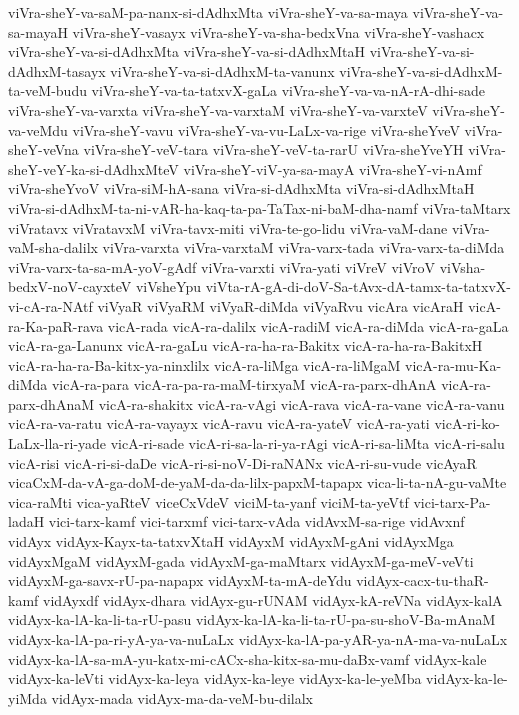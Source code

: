 {viVra-sheY-va-saM-pa-nanx-si-dAdhxMta
viVra-sheY-va-sa-maya
viVra-sheY-va-sa-mayaH
viVra-sheY-vasayx
viVra-sheY-va-sha-bedxVna
viVra-sheY-vashacx
viVra-sheY-va-si-dAdhxMta
viVra-sheY-va-si-dAdhxMtaH
viVra-sheY-va-si-dAdhxM-tasayx
viVra-sheY-va-si-dAdhxM-ta-vanunx
viVra-sheY-va-si-dAdhxM-ta-veM-budu
viVra-sheY-va-ta-tatxvX-gaLa
viVra-sheY-va-va-nA-rA-dhi-sade
viVra-sheY-va-varxta
viVra-sheY-va-varxtaM
viVra-sheY-va-varxteV
viVra-sheY-va-veMdu
viVra-sheY-vavu
viVra-sheY-va-vu-LaLx-va-rige
viVra-sheYveV
viVra-sheY-veVna
viVra-sheY-veV-tara
viVra-sheY-veV-ta-rarU
viVra-sheYveYH
viVra-sheY-veY-ka-si-dAdhxMteV
viVra-sheY-viV-ya-sa-mayA
viVra-sheY-vi-nAmf
viVra-sheYvoV
viVra-siM-hA-sana
viVra-si-dAdhxMta
viVra-si-dAdhxMtaH
viVra-si-dAdhxM-ta-ni-vAR-ha-kaq-ta-pa-TaTax-ni-baM-dha-namf
viVra-taMtarx
viVratavx
viVratavxM
viVra-tavx-miti
viVra-te-go-lidu
viVra-vaM-dane
viVra-vaM-sha-dalilx
viVra-varxta
viVra-varxtaM
viVra-varx-tada
viVra-varx-ta-diMda
viVra-varx-ta-sa-mA-yoV-gAdf
viVra-varxti
viVra-yati
viVreV
viVroV
viVsha-bedxV-noV-cayxteV
viVsheYpu
viVta-rA-gA-di-doV-Sa-tAvx-dA-tamx-ta-tatxvX-vi-cA-ra-NAtf
viVyaR
viVyaRM
viVyaR-diMda
viVyaRvu
vicAra
vicAraH
vicA-ra-Ka-paR-rava
vicA-rada
vicA-ra-dalilx
vicA-radiM
vicA-ra-diMda
vicA-ra-gaLa
vicA-ra-ga-Lanunx
vicA-ra-gaLu
vicA-ra-ha-ra-Bakitx
vicA-ra-ha-ra-BakitxH
vicA-ra-ha-ra-Ba-kitx-ya-ninxlilx
vicA-ra-liMga
vicA-ra-liMgaM
vicA-ra-mu-Ka-diMda
vicA-ra-para
vicA-ra-pa-ra-maM-tirxyaM
vicA-ra-parx-dhAnA
vicA-ra-parx-dhAnaM
vicA-ra-shakitx
vicA-ra-vAgi
vicA-rava
vicA-ra-vane
vicA-ra-vanu
vicA-ra-va-ratu
vicA-ra-vayayx
vicA-ravu
vicA-ra-yateV
vicA-ra-yati
vicA-ri-ko-LaLx-lla-ri-yade
vicA-ri-sade
vicA-ri-sa-la-ri-ya-rAgi
vicA-ri-sa-liMta
vicA-ri-salu
vicA-risi
vicA-ri-si-daDe
vicA-ri-si-noV-Di-raNANx
vicA-ri-su-vude
vicAyaR
vicaCxM-da-vA-ga-doM-de-yaM-da-da-lilx-papxM-tapapx
vica-li-ta-nA-gu-vaMte
vica-raMti
vica-yaRteV
viceCxVdeV
viciM-ta-yanf
viciM-ta-yeVtf
vici-tarx-Pa-ladaH
vici-tarx-kamf
vici-tarxmf
vici-tarx-vAda
vidAvxM-sa-rige
vidAvxnf
vidAyx
vidAyx-Kayx-ta-tatxvXtaH
vidAyxM
vidAyxM-gAni
vidAyxMga
vidAyxMgaM
vidAyxM-gada
vidAyxM-ga-maMtarx
vidAyxM-ga-meV-veVti
vidAyxM-ga-savx-rU-pa-napapx
vidAyxM-ta-mA-deYdu
vidAyx-cacx-tu-thaR-kamf
vidAyxdf
vidAyx-dhara
vidAyx-gu-rUNAM
vidAyx-kA-reVNa
vidAyx-kalA
vidAyx-ka-lA-ka-li-ta-rU-pasu
vidAyx-ka-lA-ka-li-ta-rU-pa-su-shoV-Ba-mAnaM
vidAyx-ka-lA-pa-ri-yA-ya-va-nuLaLx
vidAyx-ka-lA-pa-yAR-ya-nA-ma-va-nuLaLx
vidAyx-ka-lA-sa-mA-yu-katx-mi-cACx-sha-kitx-sa-mu-daBx-vamf
vidAyx-kale
vidAyx-ka-leVti
vidAyx-ka-leya
vidAyx-ka-leye
vidAyx-ka-le-yeMba
vidAyx-ka-le-yiMda
vidAyx-mada
vidAyx-ma-da-veM-bu-dilalx
}
